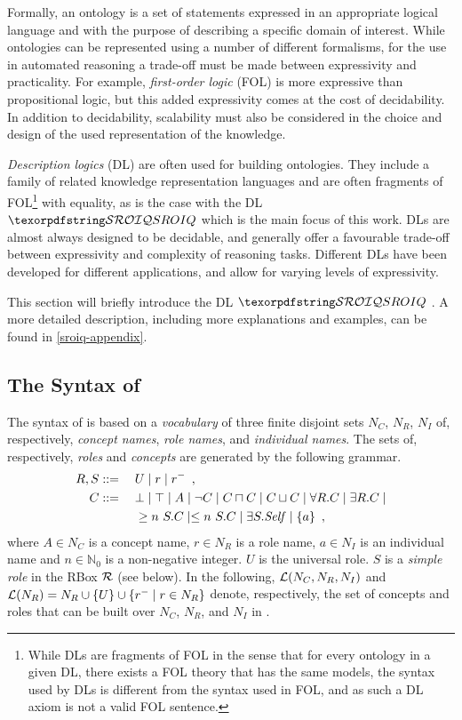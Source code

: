 Formally, an ontology is a set of statements expressed in an appropriate logical language and with the purpose of describing a specific domain of interest. While ontologies can be represented using a number of different formalisms, for the use in automated reasoning a trade-off must be made between expressivity and practicality. For example, \emph{first-order logic} (FOL) is more expressive than propositional logic, but this added expressivity comes at the cost of decidability. In addition to decidability, scalability must also be considered in the choice and design of the used representation of the knowledge.

\emph{Description logics} (DL) are often used for building ontologies. They include a family of related knowledge representation languages and are often fragments of FOL\footnote{While DLs are fragments of FOL in the sense that for every ontology in a given DL, there exists a FOL theory that has the same models, the syntax used by DLs is different from the syntax used in FOL, and as such a DL axiom is not a valid FOL sentence.} with equality, as is the case with the DL $\SROIQ$ which is the main focus of this work. DLs are almost always designed to be decidable, and generally offer a favourable trade-off between expressivity and complexity of reasoning tasks. Different DLs have been developed for different applications, and allow for varying levels of expressivity.

This section will briefly introduce the DL $\SROIQ$ \cite{horrocks2006even, rudolph2011foundations, baader_horrocks_lutz_sattler_2017}. A more detailed description, including more explanations and examples, can be found in \cref{sroiq-appendix}.

\subsection{The Syntax of \SROIQ} \label{sroiq-syntax}

The syntax of \SROIQ is based on a \emph{vocabulary} of three finite disjoint sets $N_C$, $N_R$, $N_I$ of, respectively, \emph{concept names}, \emph{role names}, and \emph{individual names}. The sets of, respectively, \SROIQ  \emph{roles} and \SROIQ \emph{concepts} are generated by the following grammar.
\begin{alignat*}{2}
  R, S &::={} && U \mid r \mid r^{-} \enspace,\\
  C &::= && \bot \mid \top \mid A \mid \neg C \mid C \sqcap C \mid C \sqcup C \mid \forall R.C \mid \exists R.C \mid \\ 
  &&& \geq n~S.C \mid \leq n~S.C \mid \exists S.\mathit{Self} \mid \{a\} \enspace,
\end{alignat*}
where $A \in N_C$ is a concept name, $r \in N_R$ is a role name, $a \in N_I$ is an individual name and $n \in \mathbb{N}_0$ is a non-negative integer. 
%
$U$ is the universal role. $S$ is a \emph{simple role} in the RBox $\mathcal{R}$ (see below). In the following, $\mathcal{L}(N_C, N_R, N_I)$ and $\mathcal{L}(N_R) = N_R \cup \{U\} \cup \{r^- \mid r \in N_R\}$ denote, respectively, the set of concepts and roles that can be built over $N_C$, $N_R$, and $N_I$ in \SROIQ.

